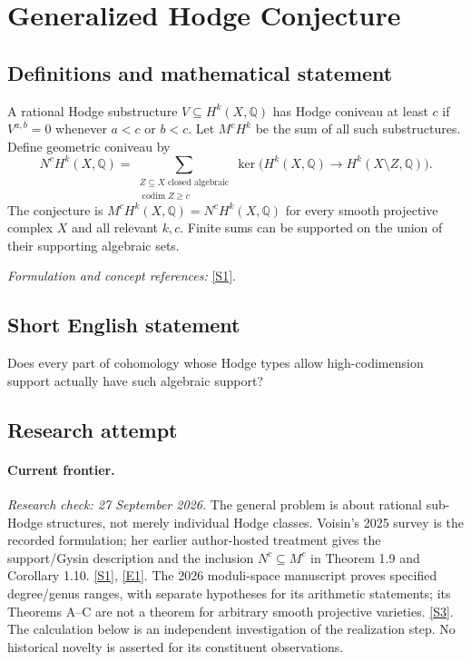\documentclass[11pt,a4paper]{article}
\newcommand{\Q}{\mathbb{Q}}
\newcommand{\sref}[2]{\hyperlink{source:#1:#2}{[S#2]}}
\newcommand{\eref}[2]{\hyperlink{extra:#1:#2}{[E#2]}}
\newif\ifshowcatalogue
\newcommand{\cataloguescope}[1]{\ifshowcatalogue
 \paragraph{Exact scope in the supplied catalogue.}
 \begin{quote}\small #1\end{quote}\fi}
\begin{document}
\setcounter{section}{0}
\clearpage
\section*{\texorpdfstring{Generalized Hodge Conjecture}{Generalized Hodge Conjecture}}\label{30000968}
\subsection{Definitions and mathematical statement}
A rational Hodge substructure $V\subseteq H^k(X,\Q)$ has Hodge coniveau at least $c$ if $V^{a,b}=0$ whenever $a<c$ or $b<c$. Let $M^cH^k$ be the sum of all such substructures. Define geometric coniveau by
\[
 N^cH^k(X,\Q)=\sum_{\substack{Z\subseteq X\text{ closed algebraic}\\ \operatorname{codim}Z\ge c}}
 \ker\bigl(H^k(X,\Q)\to H^k(X\setminus Z,\Q)\bigr).
\]
The conjecture is $M^cH^k(X,\Q)=N^cH^k(X,\Q)$ for every smooth projective complex $X$ and all relevant $k,c$. Finite sums can be supported on the union of their supporting algebraic sets.
\par\smallskip\textit{Formulation and concept references:} \sref{30000968}{1}.
\cataloguescope{For every smooth projective complex variety X and integers k,c, prove that the largest rational Hodge substructure of H\textasciicircum{}k(X,Q) with Hodge coniveau at least c equals the subspace of classes that vanish on X minus some closed algebraic subset of codimension at least c.}
\subsection{Short English statement}
Does every part of cohomology whose Hodge types allow high-codimension support actually have such algebraic support?
\subsection{Research attempt}
\paragraph{Current frontier.}
\textit{Research check: 27 September 2026.}
The general problem is about rational sub-Hodge structures, not merely
individual Hodge classes. Voisin's 2025 survey is the recorded formulation;
her earlier author-hosted treatment gives the support/Gysin description and
the inclusion $N^c\subseteq M^c$ in Theorem 1.9 and Corollary 1.10.
\sref{30000968}{1}, \eref{30000968}{1}.
The 2026 moduli-space manuscript proves specified degree/genus ranges,
with separate hypotheses for its arithmetic statements; its Theorems A--C
are not a theorem for arbitrary smooth projective varieties. \sref{30000968}{3}.
The calculation below is an independent investigation of the realization
step. No historical novelty is asserted for its constituent observations.
\end{document}
